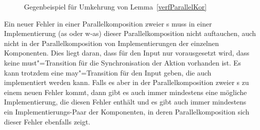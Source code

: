 \begin{figure}[htbp]
  \begin{center}
    \caption{Gegenbeispiel für Umkehrung von Lemma~\ref{verfParallelKor}}
    \label{impParallelFig}
  \end{center}
\end{figure}

Ein neuer Fehler in einer Parallelkomposition zweier \MEIO{}s
muss in einer Implementierung (as oder w-as) dieser Parallelkomposition nicht
auftauchen, auch nicht in der Parallelkomposition von Implementierungen der
einzelnen Komponenten. Dies liegt daran, dass für den Input nur vorausgesetzt
wird, dass keine must"=Transition für die Synchronisation der Aktion vorhanden
ist. Es kann trotzdem eine may"=Transition für den Input geben, die auch
implementiert werden kann. Falls es aber in der Parallelkomposition zweier
\MEIO{}s zu einem neuen Fehler kommt, dann gibt es auch immer mindestens eine
mögliche Implementierung, die diesen Fehler enthält und es gibt auch immer
mindestens ein Implementierungs-Paar der Komponenten, in deren
Parallelkomposition sich dieser Fehler ebenfalls zeigt.

